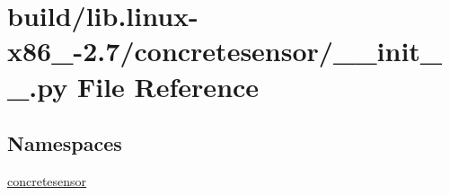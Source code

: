 \hypertarget{build_2lib_8linux-x86__64-2_87_2concretesensor_2____init_____8py}{}\section{build/lib.linux-\/x86\+\_-\/2.7/concretesensor/\+\_\+\+\_\+init\+\_\+\+\_\+.py File Reference}
\label{build_2lib_8linux-x86__64-2_87_2concretesensor_2____init_____8py}
\subsection*{Namespaces}
\begin{DoxyCompactItemize}
\item 
 \hyperlink{namespaceconcretesensor}{concretesensor}
\end{DoxyCompactItemize}
